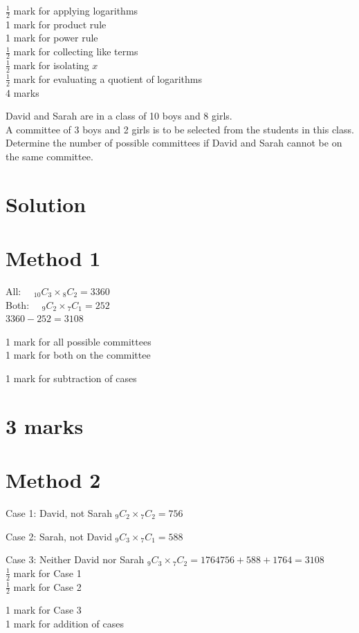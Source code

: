 \documentclass[10pt]{article}
\begin{document}
$\frac{1}{2}$ mark for applying logarithms\\
1 mark for product rule\\
1 mark for power rule\\
$\frac{1}{2}$ mark for collecting like terms\\
$\frac{1}{2}$ mark for isolating $x$\\
$\frac{1}{2}$ mark for evaluating a quotient of logarithms\\
4 marks

David and Sarah are in a class of 10 boys and 8 girls.\\
A committee of 3 boys and 2 girls is to be selected from the students in this class.\\
Determine the number of possible committees if David and Sarah cannot be on the same committee.

\section*{Solution}
\section*{Method 1}
All: $\quad{ }_{10} C_{3} \times{ }_{8} C_{2}=3360$\\
Both: $\quad{ }_{9} C_{2} \times{ }_{7} C_{1}=252$\\
$3360-252=3108$

1 mark for all possible committees\\
1 mark for both on the committee

1 mark for subtraction of cases

\section*{3 marks}
\section*{Method 2}
Case 1: David, not Sarah ${ }_{9} C_{2} \times{ }_{7} C_{2}=756$

Case 2: Sarah, not David ${ }_{9} C_{3} \times{ }_{7} C_{1}=588$

Case 3: Neither David nor Sarah ${ }_{9} C_{3} \times{ }_{7} C_{2}=1764 756+588+1764=3108$\\
$\frac{1}{2}$ mark for Case 1\\
$\frac{1}{2}$ mark for Case 2

1 mark for Case 3\\
1 mark for addition of cases
\end{document}
